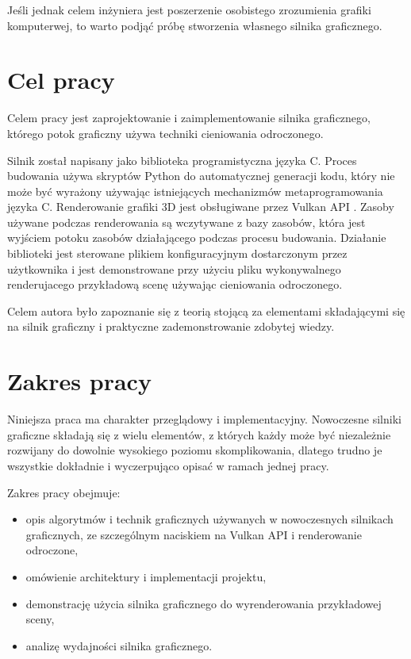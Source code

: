 Jeśli jednak celem inżyniera jest poszerzenie osobistego zrozumienia grafiki komputerwej, to warto podjąć próbę stworzenia własnego silnika graficznego.


\section{Cel pracy}

Celem pracy jest zaprojektowanie i zaimplementowanie silnika graficznego, którego potok graficzny używa techniki cieniowania odroczonego.

Silnik został napisany jako biblioteka programistyczna języka C.
Proces budowania używa skryptów Python do automatycznej generacji kodu, który nie może być wyrażony używając istniejących mechanizmów metaprogramowania języka C.
Renderowanie grafiki 3D jest obsługiwane przez Vulkan API \cite{VULKANSPEC}.
Zasoby używane podczas renderowania są wczytywane z bazy zasobów, która jest wyjściem potoku zasobów działającego podczas procesu budowania.
Działanie biblioteki jest sterowane plikiem konfiguracyjnym dostarczonym przez użytkownika i jest demonstrowane przy użyciu pliku wykonywalnego renderujacego przykładową scenę używając cieniowania odroczonego.

Celem autora było zapoznanie się z teorią stojącą za elementami składającymi się na silnik graficzny i praktyczne zademonstrowanie zdobytej wiedzy.


\section{Zakres pracy}

Niniejsza praca ma charakter przeglądowy i implementacyjny. Nowoczesne silniki graficzne składają się z wielu elementów, z których każdy może być niezależnie rozwijany do dowolnie wysokiego poziomu skomplikowania, dlatego trudno je wszystkie dokładnie i wyczerpująco opisać w ramach jednej pracy.

Zakres pracy obejmuje:
\begin{itemize}
	\item {opis algorytmów i technik graficznych używanych w nowoczesnych silnikach graficznych, ze szczególnym naciskiem na Vulkan API i renderowanie odroczone},
	\item{omówienie architektury i implementacji projektu},
	\item{demonstrację użycia silnika graficznego do wyrenderowania przykładowej sceny},
	\item{analizę wydajności silnika graficznego}.
\end{itemize}

